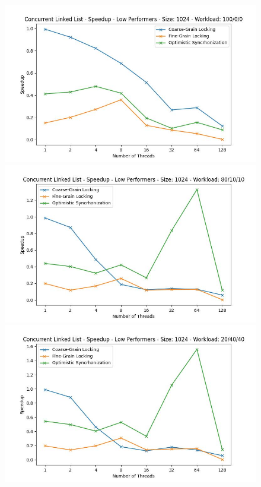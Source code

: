 \documentclass[../final_report.tex]{subfiles}
\begin{document}
\begin{figure}[H]
    \centering
        \includegraphics[scale=0.4]{outFiles/plots/concurrent_data_structs_low_speedup_1024_100_0_0.jpg}
        \includegraphics[scale=0.4]{outFiles/plots/concurrent_data_structs_low_speedup_1024_80_10_10.jpg}
        \includegraphics[scale=0.4]{outFiles/plots/concurrent_data_structs_low_speedup_1024_20_40_40.jpg}

\end{figure}
\end{document}
